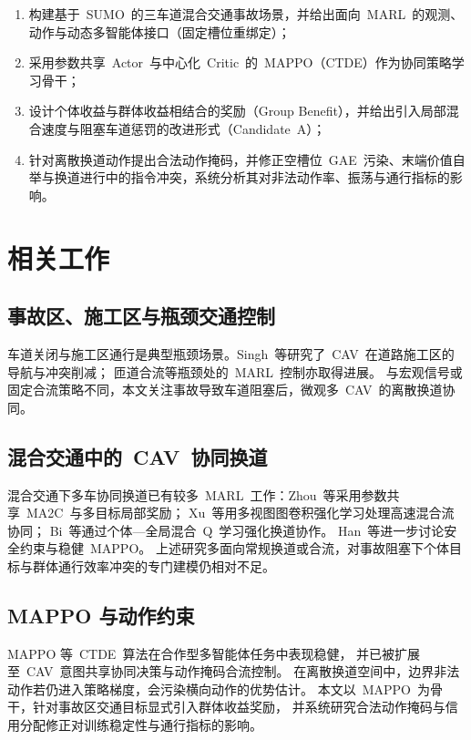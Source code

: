 \documentclass[UTF8,a4paper,11pt]{ctexart}
\begin{document}
\begin{enumerate}[leftmargin=2em]
  \item 构建基于~SUMO~的三车道混合交通事故场景，并给出面向~MARL~的观测、动作与动态多智能体接口（固定槽位重绑定）；
  \item 采用参数共享~Actor~与中心化~Critic~的~MAPPO（CTDE）作为协同策略学习骨干；
  \item 设计个体收益与群体收益相结合的奖励（Group Benefit），并给出引入局部混合速度与阻塞车道惩罚的改进形式（Candidate~A）；
  \item 针对离散换道动作提出合法动作掩码，并修正空槽位~GAE~污染、末端价值自举与换道进行中的指令冲突，系统分析其对非法动作率、振荡与通行指标的影响。
\end{enumerate}

\section{相关工作}

\subsection{事故区、施工区与瓶颈交通控制}
车道关闭与施工区通行是典型瓶颈场景。Singh~等\cite{singh2023roadworks}研究了~CAV~在道路施工区的导航与冲突削减；
匝道合流等瓶颈处的~MARL~控制亦取得进展\cite{chen2023merging,zhao2024ammappo}。
与宏观信号或固定合流策略不同，本文关注事故导致车道阻塞后，微观多~CAV~的离散换道协同。

\subsection{混合交通中的~CAV~协同换道}
混合交通下多车协同换道已有较多~MARL~工作：Zhou~等\cite{zhou2022marl}采用参数共享~MA2C~与多目标局部奖励；
Xu~等\cite{xu2023mvgrl}用多视图图卷积强化学习处理高速混合流协同；
Bi~等\cite{bi2024mqlc}通过个体—全局混合~Q~学习强化换道协作。
Han~等\cite{han2024safe,han2023safermm}进一步讨论安全约束与稳健~MAPPO。
上述研究多面向常规换道或合流，对事故阻塞下个体目标与群体通行效率冲突的专门建模仍相对不足。

\subsection{MAPPO 与动作约束}
MAPPO 等~CTDE~算法在合作型多智能体任务中表现稳健\cite{yu2022mappo}，
并已被扩展至~CAV~意图共享协同决策\cite{guo2024mappopis}与动作掩码合流控制\cite{zhao2024ammappo}。
在离散换道空间中，边界非法动作若仍进入策略梯度，会污染横向动作的优势估计。
本文以~MAPPO~为骨干，针对事故区交通目标显式引入群体收益奖励，
并系统研究合法动作掩码与信用分配修正对训练稳定性与通行指标的影响。
\end{document}
